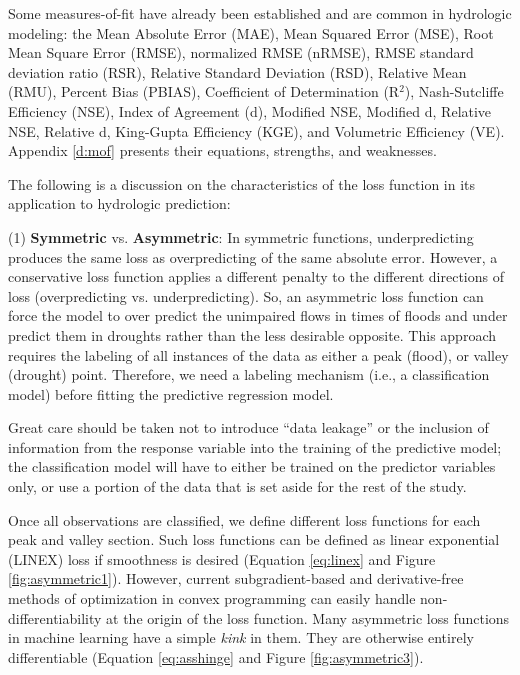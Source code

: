 Some measures-of-fit have already been established and are common in hydrologic modeling: the Mean Absolute Error (MAE), Mean Squared Error (MSE), Root Mean Square Error (RMSE), normalized RMSE (nRMSE), RMSE standard deviation ratio (RSR), Relative Standard Deviation (RSD), Relative Mean (RMU), Percent Bias (PBIAS), Coefficient of Determination (R$^2$), Nash-Sutcliffe Efficiency (NSE), Index of Agreement (d), Modified NSE, Modified d, Relative NSE, Relative d, King-Gupta Efficiency (KGE), and Volumetric Efficiency (VE). Appendix \ref{d:mof} presents their equations, strengths, and weaknesses. 

The following is a discussion on the characteristics of the loss function in its application to hydrologic prediction:

(1) \textbf{Symmetric} vs. \textbf{Asymmetric}: In symmetric functions, underpredicting produces the same loss as overpredicting of the same absolute error. However, a conservative loss function applies a different penalty to the different directions of loss (overpredicting vs. underpredicting). So, an asymmetric loss function can force the model to over predict the unimpaired flows in times of floods and under predict them in droughts rather than the less desirable opposite. This approach requires the labeling of all instances of the data as either a peak (flood), or valley (drought) point. Therefore, we need a labeling mechanism (i.e., a classification model) before fitting the predictive regression model. 

Great care should be taken not to introduce ``data leakage'' or the inclusion of information from the response variable into the training of the predictive model; the classification model will have to either be trained on the predictor variables only, or use a portion of the data that is set aside for the rest of the study. 

Once all observations are classified, we define different loss functions for each peak and valley section. Such loss functions can be defined as linear exponential (LINEX) loss if smoothness is desired (Equation \ref{eq:linex} and Figure \ref{fig:asymmetric1}). However, current subgradient-based and derivative-free methods of optimization in convex programming can easily handle non-differentiability at the origin of the loss function. Many asymmetric loss functions in machine learning have a simple \textit{kink} in them. They are otherwise entirely differentiable (Equation \ref{eq:asshinge} and Figure \ref{fig:asymmetric3}).

